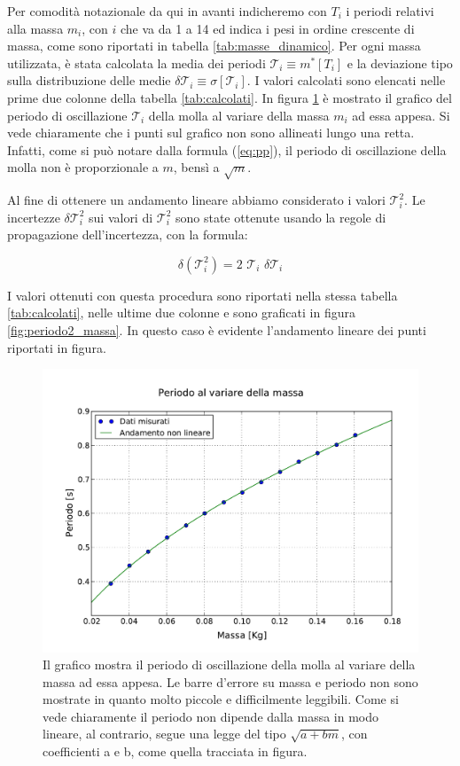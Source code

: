 Per comodità notazionale da qui in avanti indicheremo con $T_i$ i periodi relativi alla massa $m_i$, con $i$ che va da 1 a 14 ed
indica i pesi in ordine crescente di massa, come sono riportati in tabella \ref{tab:masse_dinamico}.
Per ogni massa utilizzata, è stata calcolata la media dei periodi $\mathcal{T}_i \equiv m^*[T_i]$ e la deviazione tipo sulla distribuzione
delle medie $\delta \mathcal{T}_i \equiv \sigma[\mathcal{T}_i]$. I valori calcolati sono elencati nelle prime
due colonne della tabella \ref{tab:calcolati}.
In figura \ref{fig:periodo_massa} è mostrato il grafico del periodo di oscillazione $\mathcal{T}_i$ della molla al variare della massa $m_i$ ad essa appesa. Si vede chiaramente
che i punti sul grafico non sono allineati lungo una retta. Infatti, come si può notare dalla formula (\ref{eq:pp}),
il periodo di oscillazione della molla non è proporzionale a $m$, bensì a $\sqrt{m}$.

Al fine di ottenere un andamento lineare abbiamo considerato i valori $\mathcal{T}_i^2$. Le incertezze $\delta \mathcal{T}_i^2$
sui valori di $\mathcal{T}_i^2$ sono state ottenute usando la regole di propagazione dell'incertezza, con la formula:

\begin{equation*}
    \delta(\mathcal{T}_i^2) = 2 \,\, \mathcal{T}_i \,\, \delta \mathcal{T}_i
\end{equation*}

I valori ottenuti con questa procedura sono riportati nella stessa tabella \ref{tab:calcolati}, nelle ultime due colonne e sono
graficati in figura \ref{fig:periodo2_massa}. In questo caso è evidente l'andamento lineare dei punti riportati in figura.

\begin{figure}
    \centering
    \includegraphics[width=120mm]{immagini/periodo_massa.pdf}
    \caption{Il grafico mostra il periodo di oscillazione della molla al variare della massa ad essa appesa.
        Le barre d'errore su massa e periodo non sono mostrate in quanto molto piccole e difficilmente leggibili.
        Come si vede chiaramente il periodo non dipende dalla massa in modo lineare, al contrario, segue una legge del tipo
        $\sqrt{a + bm}$, con coefficienti a e b, come quella tracciata in figura.}
    \label{fig:periodo_massa}
\end{figure}

